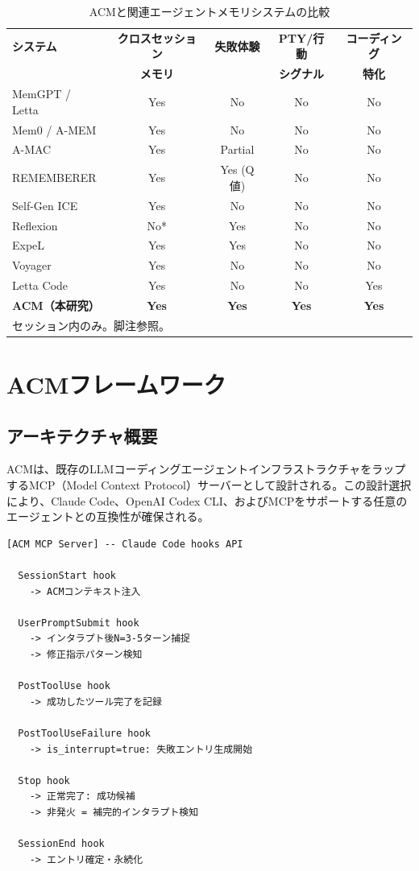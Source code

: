 \documentclass[conference]{IEEEtran}
\begin{document}
\begin{table}[t]
\centering
\caption{ACMと関連エージェントメモリシステムの比較}
\label{tab:comparison}
\begin{tabular}{lcccc}
\toprule
\textbf{システム} & \textbf{クロスセッション} & \textbf{失敗体験} & \textbf{PTY/行動} & \textbf{コーディング} \\
 & \textbf{メモリ} &  & \textbf{シグナル} & \textbf{特化} \\
\midrule
MemGPT / Letta & Yes & No & No & No \\
Mem0 / A-MEM & Yes & No & No & No \\
A-MAC & Yes & Partial & No & No \\
REMEMBERER & Yes & Yes (Q値) & No & No \\
Self-Gen ICE & Yes & No & No & No \\
Reflexion & No* & Yes & No & No \\
ExpeL & Yes & Yes & No & No \\
Voyager & Yes & No & No & No \\
Letta Code & Yes & No & No & Yes \\
\textbf{ACM（本研究）} & \textbf{Yes} & \textbf{Yes} & \textbf{Yes} & \textbf{Yes} \\
\bottomrule
\multicolumn{5}{l}{\small *セッション内のみ。脚注参照。}
\end{tabular}
\end{table}

\section{ACMフレームワーク}

\subsection{アーキテクチャ概要}

ACMは、既存のLLMコーディングエージェントインフラストラクチャをラップするMCP（Model Context Protocol）サーバーとして設計される。この設計選択により、Claude Code、OpenAI Codex CLI、およびMCPをサポートする任意のエージェントとの互換性が確保される。

\begin{lstlisting}[caption={ACM MCP Server hookアーキテクチャ},label={lst:hooks}]
[ACM MCP Server] -- Claude Code hooks API

  SessionStart hook
    -> ACMコンテキスト注入

  UserPromptSubmit hook
    -> インタラプト後N=3-5ターン捕捉
    -> 修正指示パターン検知

  PostToolUse hook
    -> 成功したツール完了を記録

  PostToolUseFailure hook
    -> is_interrupt=true: 失敗エントリ生成開始

  Stop hook
    -> 正常完了: 成功候補
    -> 非発火 = 補完的インタラプト検知

  SessionEnd hook
    -> エントリ確定・永続化
\end{lstlisting}
\end{document}
